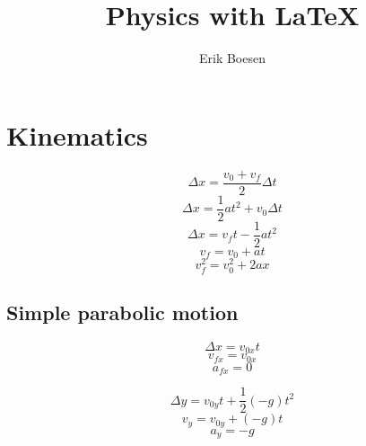 \documentclass[twocolumn]{article}
\begin{document}
\title{Physics with \LaTeX}
\author{Erik Boesen}
\maketitle

\section*{Kinematics}
$$\Delta x=\frac{v_0+v_f}{2}\Delta t$$
$$\Delta x=\frac{1}{2}at^2+v_0\Delta t$$
$$\Delta x=v_ft-\frac{1}{2}at^2$$
$$v_f=v_0+at$$
$$v_f^2=v_0^2+2ax$$
\subsection*{Simple parabolic motion}
$$\Delta x=v_{0x}t$$
$$v_{fx}=v_{0x}$$
$$a_{fx}=0$$

$$\Delta y=v_{0y}t+\frac{1}{2}(-g)t^2$$
$$v_{y}=v_{0y}+(-g)t$$
$$a_{y}=-g$$
\end{document}
